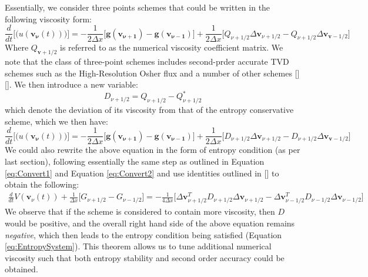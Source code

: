 \documentclass[a4paper]{article}
\numberwithin{equation}{section}
\begin{document}
Essentially, we consider three points schemes that could be written in the following viscosity form:
\begin{equation} \label{eq:EntropyConservedScheme_Viscosity_form}
    \frac{d}{dt}\big[\mathbf(
    u(\mathbf{v_\nu}(t)))\big] = - \frac{1}{2\Delta x} \big[\mathbf
    {g}(\mathbf{v_{\nu+1}}) - \mathbf{g}(\mathbf{v_{\nu-1}})\big] + \frac{1}{2\Delta x} \big[Q_{\nu + 1/2} \Delta \mathbf{v}_{\nu+1/2} - Q_{\nu + 1/2} \Delta \mathbf{v}_{\mathbf{v}-1/2}\big]
\end{equation}
Where $Q_{\mathbf{v}+1/2}$ is referred to as the numerical viscosity coefficient matrix. We note that the class of three-point schemes includes second-prder accurate TVD schemes such as the High-Resolution Osher flux and a number of other schemes [][]. We then introduce a new variable:
\begin{equation}
    D_{\nu + 1/2} = Q_{\nu + 1/2} - Q_{\nu + 1/2}^*
\end{equation}
which denote the deviation of its viscosity from that of the entropy conservative scheme, which we then have:
\begin{equation}
    \frac{d}{dt}\big[\mathbf(
    u(\mathbf{v_\nu}(t)))\big] = - \frac{1}{2\Delta x} \big[\mathbf
    {g}(\mathbf{v_{\nu+1}}) - \mathbf{g}(\mathbf{v_{\nu-1}})\big] + \frac{1}{2\Delta x} \big[D_{\nu + 1/2} \Delta \mathbf{v}_{\nu+1/2} - D_{\nu + 1/2} \Delta \mathbf{v}_{\mathbf{v}-1/2}\big]
\end{equation}
We could also rewrite the above equation in the form of entropy condition (as per last section), following essentially the same step as outlined in Equation \ref{eq:Convert1} and Equation \ref{eq:Convert2} and use identities outlined in [] to obtain the following:
\begin{equation}
    \begin{split}
        \frac{d}{dt} V(\mathbf{v}_\nu(t)) + \frac{1}{\Delta x}\big[G_{\nu + 1/2} - G_{\nu - 1/2}\big] = -\frac{1}{4\Delta x} \big[\Delta \mathbf{v}_{\nu+1/2}^T D_{\nu + 1/2} \Delta \mathbf{v}_{\nu+1/2} - \Delta \mathbf{v}_{\nu-1/2}^T D_{\nu - 1/2} \Delta \mathbf{v}_{\nu-1/2}\big]
    \end{split}
\end{equation}
We observe that if the scheme is considered to contain more viscosity, then $D$ would be positive, and the overall right hand side of the above equation remains \textit{negative}, which then leads to the entropy condition being satisfied (Equation \ref{eq:EntropySystem}). This theorem allows us to tune additional numerical viscosity such that both entropy stability and second order accuracy could be obtained.
\end{document}

